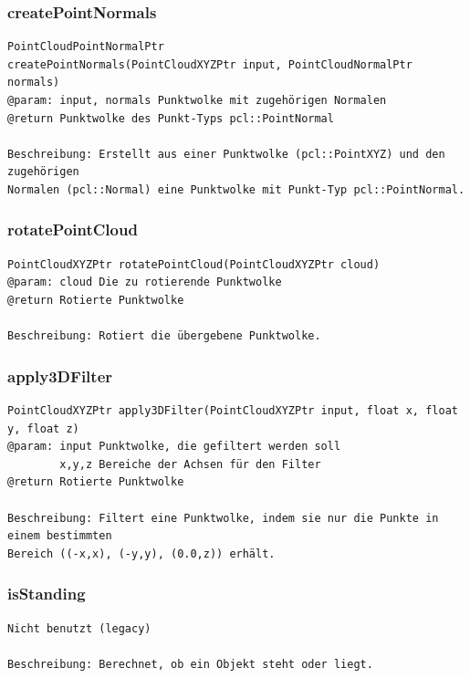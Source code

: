 \documentclass{suturo}
\begin{document}
\subsubsection{createPointNormals}
\begin{verbatim}
PointCloudPointNormalPtr
createPointNormals(PointCloudXYZPtr input, PointCloudNormalPtr normals)
@param: input, normals Punktwolke mit zugehörigen Normalen
@return Punktwolke des Punkt-Typs pcl::PointNormal

Beschreibung: Erstellt aus einer Punktwolke (pcl::PointXYZ) und den zugehörigen
Normalen (pcl::Normal) eine Punktwolke mit Punkt-Typ pcl::PointNormal.
\end{verbatim}\label{func:createpointnormals}

\subsubsection{rotatePointCloud}
\begin{verbatim}
PointCloudXYZPtr rotatePointCloud(PointCloudXYZPtr cloud) 
@param: cloud Die zu rotierende Punktwolke
@return Rotierte Punktwolke

Beschreibung: Rotiert die übergebene Punktwolke.
\end{verbatim}\label{func:rotatepointcloud}


\subsubsection{apply3DFilter}
\begin{verbatim}
PointCloudXYZPtr apply3DFilter(PointCloudXYZPtr input, float x, float y, float z)
@param: input Punktwolke, die gefiltert werden soll
		x,y,z Bereiche der Achsen für den Filter
@return Rotierte Punktwolke

Beschreibung: Filtert eine Punktwolke, indem sie nur die Punkte in einem bestimmten
Bereich ((-x,x), (-y,y), (0.0,z)) erhält.
\end{verbatim}\label{func:apply3dfilter}


\subsubsection{isStanding}
\begin{verbatim}
Nicht benutzt (legacy)

Beschreibung: Berechnet, ob ein Objekt steht oder liegt.
\end{verbatim}\label{func:isstanding}
\end{document}
